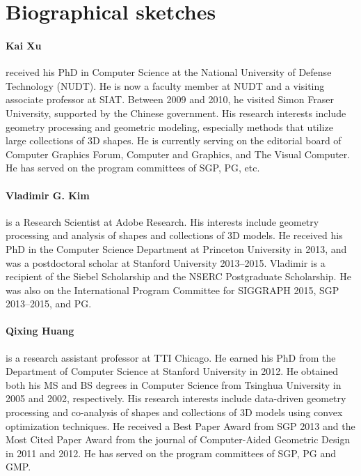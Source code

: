 \section*{Biographical sketches}
\label{sec:bios}

\paragraph*{Kai Xu} received his PhD in Computer Science at the National University of Defense Technology (NUDT).
He is now a faculty member at NUDT and a visiting associate professor at SIAT.
Between 2009 and 2010, he visited Simon Fraser University, supported by the Chinese government. His research interests include geometry processing and geometric modeling, especially methods that utilize large collections of 3D shapes.
He is currently serving on the editorial board of Computer Graphics Forum, Computer and Graphics, and The Visual Computer.
He has served on the program committees of SGP, PG, etc.


\paragraph*{Vladimir G. Kim} is a Research Scientist at Adobe Research. His interests include geometry processing and analysis of shapes and collections of 3D models. He received his PhD in the Computer Science Department at Princeton University in 2013, and was a postdoctoral scholar at Stanford University 2013--2015. Vladimir is a recipient of the Siebel Scholarship and the NSERC Postgraduate Scholarship. He was also on the International Program Committee for SIGGRAPH 2015, SGP 2013--2015, and PG.


\paragraph*{Qixing Huang} is a research assistant professor at TTI Chicago. He earned his PhD from the Department of Computer Science at Stanford University in 2012. He obtained both his MS and BS degrees in Computer Science from Tsinghua University in 2005 and 2002, respectively. His research interests include data-driven geometry processing and co-analysis of shapes and collections of 3D models using convex optimization techniques. He received a Best Paper Award from SGP 2013 and the Most Cited Paper Award from the journal of Computer-Aided Geometric Design in 2011 and 2012. He has served on the program committees of SGP, PG and GMP.

